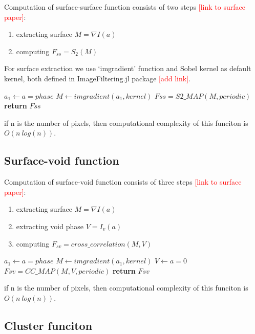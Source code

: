 \documentclass[reprint,amsmath,amssymb,aps,pre,showkeys,showpacs,nofootinbib]{revtex4-1}
\begin{document}
Computation of surface-surface function consists of two steps 
\textcolor{red}{[link to surface paper]}:
\begin{enumerate}
  \item extracting surface $M = \nabla I(a)$
  \item computing $F_{ss} = S_2(M)$
\end{enumerate}

For surface extraction we use `imgradient' function
and Sobel kernel as default kernel, 
both defined in ImageFiltering.jl package \textcolor{red}{[add link]}.

\begin{algorithmic}[1]
    \State $a_1 \gets a = phase$
    \State $M \gets imgradient(a_1, kernel)$
    \State $Fss = S2\_MAP(M, periodic)$
    \State \textbf{return} $Fss$
  \EndProcedure
\end{algorithmic}

if n is the number of pixels, then computational complexity
of this funciton is $O(n\ log(n))$.

\subsection{Surface-void function}


Computation of surface-void function consists of three steps 
\textcolor{red}{[link to surface paper]}:
\begin{enumerate}
  \item extracting surface $M = \nabla I(a)$
  \item extracting void phase $V = I_v(a)$
  \item computing $F_{sv} = cross\_correlation(M, V)$
\end{enumerate}

\begin{algorithmic}[1]
    \State $a_1 \gets a = phase$
    \State $M \gets imgradient(a_1, kernel)$
    \State $V \gets a = 0$
    \State $Fsv = CC\_MAP(M, V, periodic)$
    \State \textbf{return} $Fsv$
  \EndProcedure
\end{algorithmic}

if n is the number of pixels, then computational complexity
of this funciton is $O(n\ log(n))$.

\subsection{Cluster funciton}
\end{document}
